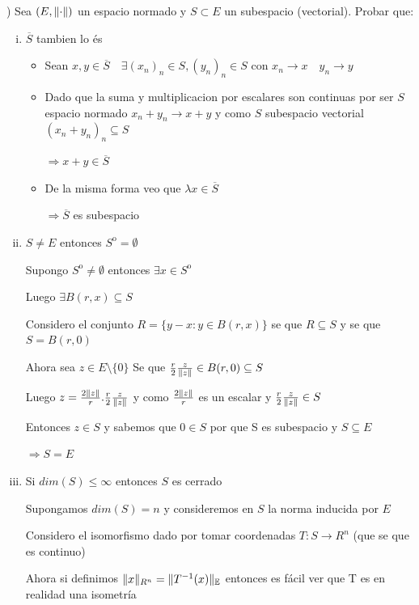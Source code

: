 \documentclass[12pt]{article}
\newcommand{\E}{\mathbb{E}}
\newcommand{\Ra}{\Rightarrow}
\newcommand{\ra}{\rightarrow}
\newcommand{\ol}{\overline}
\DeclarePairedDelimiter{\norm}{\lVert}{\rVert}
\begin{document}
) Sea $(E,\norm{\cdot})$ un espacio normado y $S \subset E$ un subespacio (vectorial). Probar que:

\begin{enumerate}[i.]

	\item $\ol S$ tambien lo és
		\begin{itemize}
			\item Sean $x,y \in \ol S \quad \exists (x_{n})_{n} \in S , (y_{n})_{n}  \in S$ con $x_{n} \ra x \quad y_{n} \ra y$

			\item Dado que la suma y multiplicacion por escalares son continuas por ser $S$ espacio normado $x_{n} + y_{n} \ra x + y$ y como $S$ subespacio vectorial $(x_{n} + y_{n})_{n} \subseteq S$

			$\Ra x+y \in \ol S$

			\item De la misma forma veo que $\lambda x \in \ol S$

			$\Ra \ol S$ es subespacio

		\end{itemize}

	\item $S \ne E$ entonces $S^\mathrm{o} = \emptyset$

		Supongo $S^\mathrm{o} \neq \emptyset$ entonces $ \exists x \in S^\mathrm{o}$

		Luego $\exists B(r,x) \subseteq S$

		Considero el conjunto $R = \{y - x : y \in B(r,x)\}$ se que $R \subseteq S$ y se que $S = B(r,0)$ 

		Ahora sea $z \in E \setminus \{0\}$ Se que $\frac{r}{2}\frac{z}{\norm{z}} \in B(r,0) \subseteq S$

		Luego $z= \frac{2\norm{z}}{r}.\frac{r}{2}\frac{z}{\norm{z}} $ y como $\frac{2\norm{z}}{r}$ es un escalar y $\frac{r}{2}\frac{z}{\norm{z}} \in S $

		Entonces $ z \in S $ y sabemos que $0 \in S$ por que S es subespacio y $S \subseteq E$

		$\Ra S = E$
		
	\item Si $dim(S) \leq \infty $ entonces $S$ es cerrado

		Supongamos $dim(S)=n$ y consideremos en $S$ la norma inducida por $E$

		Considero el isomorfismo dado por tomar coordenadas $T:S \ra R^n$ (que se que es continuo)

		Ahora si definimos $\norm {x}_{R^n} = \norm{T^{-1}(x)}_{\E}$ entonces es fácil ver que T es en realidad una isometría


\end{enumerate}
\end{document}
